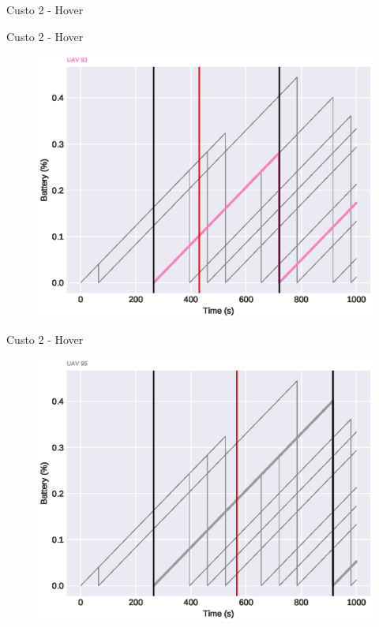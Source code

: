 \begin{frame}{Custo 2 - Hover}
\begin{figure}[!htb]
                 \end{figure}
            \end{frame}\begin{frame}{Custo 2 - Hover}
                \begin{figure}[!htb]
                     \includegraphics[width=\textwidth]{custo_2/uav_hover_acum_uav_7.eps}
                 \end{figure}
            \end{frame}\begin{frame}{Custo 2 - Hover}
                \begin{figure}[!htb]
                     \includegraphics[width=\textwidth]{custo_2/uav_hover_acum_uav_9.eps}

\end{figure}
\end{frame}
